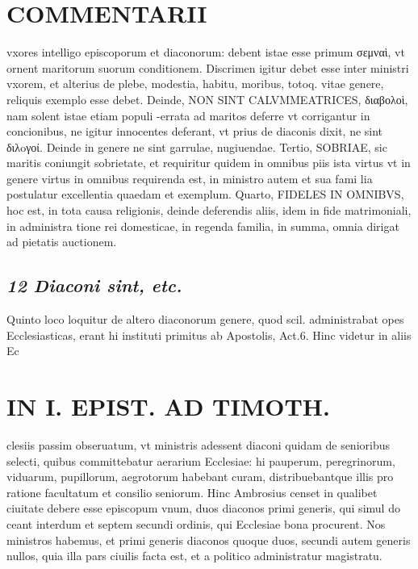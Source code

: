 \documentclass{article}
\begin{document}
\begin{pages}
\section*{COMMENTARII }
\marginpar{[ p.74 ]}\pstart vxores intelligo episcoporum et diaconorum: debent istae esse primum σεμναὶ, vt ornent maritorum suorum conditionem. Discrimen igitur debet esse inter ministri vxorem, et alterius de plebe, modestia, habitu, moribus, totoq. vitae genere, reliquis exemplo esse debet. Deinde, NON SINT CALVMMEATRICES, διαβολοὶ, nam solent istae etiam populi -errata ad maritos deferre vt corrigantur in concionibus, ne igitur innocentes deferant, vt prius de diaconis dixit, ne sint διλoγοί. Deinde in genere ne sint garrulae, nugiuendae.  \pend\pstart Tertio, SOBRIAE, sic maritis coniungit sobrietate, et requiritur quidem in omnibus piis ista virtus vt in genere virtus in omnibus requirenda est, in ministro autem et sua fami lia postulatur excellentia quaedam et exemplum.  \pend\pstart Quarto, FIDELES IN OMNIBVS, hoc est, in tota causa religionis, deinde deferendis aliis, idem in fide matrimoniali, in administra tione rei domesticae, in regenda familia, in summa, omnia dirigat ad pietatis auctionem.  \pend
{}
{}
\subsection*{\textit{12 Diaconi sint, etc. }}\pstart Quinto loco loquitur de altero diaconorum genere, quod scil. administrabat opes Ecclesiasticas, erant hi instituti primitus ab Apostolis, Act.6. Hinc videtur in aliis Ec\pend
\section*{IN I. EPIST. AD TIMOTH. }
\marginpar{[ p.75 ]}\pstart clesiis passim obseruatum, vt ministris adessent diaconi quidam de senioribus selecti, quibus committebatur aerarium Ecclesiae: hi pauperum, peregrinorum, viduarum, pupillorum, aegrotorum habebant curam, distribuebantque illis pro ratione facultatum et consilio seniorum. Hinc Ambrosius censet in qualibet ciuitate debere esse episcopum vnum, duos diaconos primi generis, qui simul do ceant interdum et septem secundi ordinis, qui Ecclesiae bona procurent. Nos ministros habemus, et primi generis diaconos quoque duos, secundi autem generis nullos, quia illa pars ciuilis facta est, et a politico administratur magistratu.  \pend
{}
{}

\end{pages}
\end{document}

